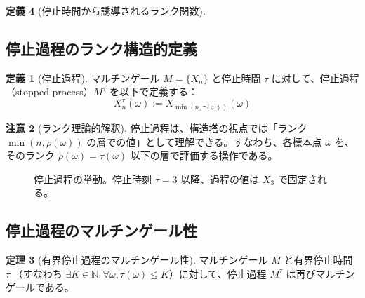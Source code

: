\documentclass[a4paper,11pt]{ltjsarticle}
\theoremstyle{definition}
\newtheorem{theorem}{定理}[section]
\newtheorem{definition}[theorem]{定義}
\newtheorem{remark}[theorem]{注意}
\newcommand{\N}{\mathbb{N}}
\begin{document}
\begin{definition}[停止時間から誘導されるランク関数]
\subsection{停止過程のランク構造的定義}

\begin{definition}[停止過程]
マルチンゲール $M = \{X_n\}$ と停止時間 $\tau$ に対して、停止過程（stopped process）$M^\tau$ を以下で定義する：
\[
X_n^\tau(\omega) := X_{\min(n, \tau(\omega))}(\omega)
\]
\end{definition}

\begin{remark}[ランク理論的解釈]
停止過程は、構造塔の視点では「ランク $\min(n, \rho(\omega))$ の層での値」として理解できる。すなわち、各標本点 $\omega$ を、そのランク $\rho(\omega) = \tau(\omega)$ 以下の層で評価する操作である。
\end{remark}

\begin{figure}[htbp]
\centering
{}
\caption{停止過程の挙動。停止時刻 $\tau=3$ 以降、過程の値は $X_3$ で固定される。}
\end{figure}

\subsection{停止過程のマルチンゲール性}

\begin{theorem}[有界停止過程のマルチンゲール性]\label{thm:stopped-martingale}
マルチンゲール $M$ と有界停止時間 $\tau$ （すなわち $\exists K \in \N, \forall \omega, \tau(\omega) \leq K$）に対して、停止過程 $M^\tau$ は再びマルチンゲールである。
\end{theorem}


\end{definition}
\end{document}
